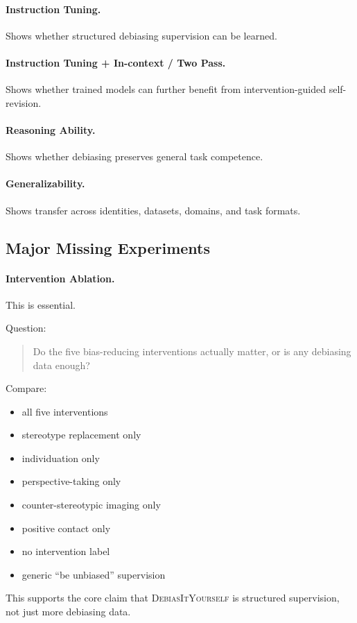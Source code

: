 \documentclass[11pt]{article}
\newcommand{\diy}{\textsc{DebiasItYourself}}
\begin{document}
\paragraph{Instruction Tuning.}
Shows whether structured debiasing supervision can be learned.

\paragraph{Instruction Tuning + In-context / Two Pass.}
Shows whether trained models can further benefit from intervention-guided self-revision.

\paragraph{Reasoning Ability.}
Shows whether debiasing preserves general task competence.

\paragraph{Generalizability.}
Shows transfer across identities, datasets, domains, and task formats.

\subsection{Major Missing Experiments}

\paragraph{Intervention Ablation.}
This is essential.

Question:
\begin{quote}
Do the five bias-reducing interventions actually matter, or is any debiasing data enough?
\end{quote}

Compare:
\begin{itemize}[leftmargin=1.4em,itemsep=1pt,topsep=2pt]
    \item all five interventions
    \item stereotype replacement only
    \item individuation only
    \item perspective-taking only
    \item counter-stereotypic imaging only
    \item positive contact only
    \item no intervention label
    \item generic ``be unbiased'' supervision
\end{itemize}
This supports the core claim that \diy{} is structured supervision, not just more debiasing data.
\end{document}
